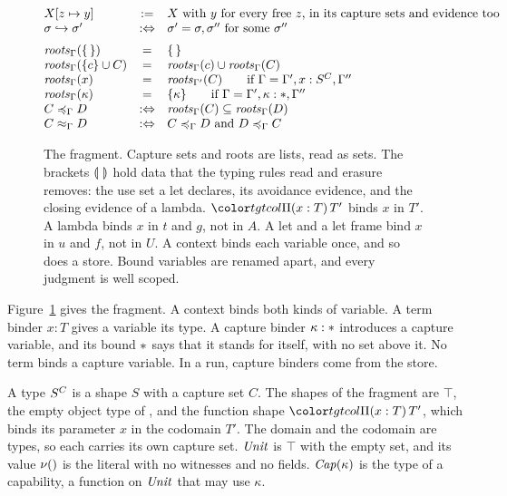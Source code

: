 \begin{figure}[t]
\[\begin{array}{@{}lcl@{}}
X[z \mapsto y] & \mathrel{:=} & X \text{ with } y \text{ for every free } z \text{, in its capture sets and evidence too} \\
\sext{\sigma}{\sigma'} & \mathrel{:\Leftrightarrow} & \sigma' = \sigma, \sigma'' \text{ for some } \sigma'' \\[6pt]
\roots{\Gamma}{\cempty} & = & \cempty \\
\roots{\Gamma}{\cset{c} \cup C} & = & \roots{\Gamma}{c} \cup \roots{\Gamma}{C} \\
\roots{\Gamma}{x} & = & \roots{\Gamma'}{C} \qquad \text{if } \Gamma = \Gamma', x : \capt{S}{C}, \Gamma'' \\
\roots{\Gamma}{\kappa} & = & \cset{\kappa} \qquad \text{if } \Gamma = \Gamma', \kappa : \cstar, \Gamma'' \\
\caple{\Gamma}{C}{D} & \mathrel{:\Leftrightarrow} & \roots{\Gamma}{C} \subseteq \roots{\Gamma}{D} \\
\capeqv{\Gamma}{C}{D} & \mathrel{:\Leftrightarrow} & \caple{\Gamma}{C}{D} \text{ and } \caple{\Gamma}{D}{C}
\end{array}
\]
\color{black}
\caption{The fragment. Capture sets and roots are lists, read as sets. The brackets $\mathopen{\llparenthesis}\ \mathclose{\rrparenthesis}$ hold data that the typing rules read and erasure removes: the use set a let declares, its avoidance evidence, and the closing evidence of a lambda. $\pit[x]{T}{T'}$ binds $x$ in $T'$. A lambda binds $x$ in $t$ and $g$, not in $A$. A let and a let frame bind $x$ in $u$ and $f$, not in $U$. A context binds each variable once, and so does a store. Bound variables are renamed apart, and every judgment is well scoped.}
\label{fig:mini-syntax}
\end{figure}

Figure~\ref{fig:mini-syntax} gives the fragment. A context binds both kinds of variable. A term binder $x : T$ gives a variable its type. A capture binder $\kappa : \ast$ introduces a capture variable, and its bound $\ast$ says that it stands for itself, with no set above it. No term binds a capture variable. In a run, capture binders come from the store.

A type $S^{C}$ is a shape $S$ with a capture set $C$. The shapes of the fragment are $\top$, the empty object type of \Rone, and the function shape $\pit[x]{T}{T'}$, which binds its parameter $x$ in the codomain $T'$. The domain and the codomain are types, so each carries its own capture set. $\mathit{Unit}$ is $\top$ with the empty set, and its value $\nu()$ is the literal with no witnesses and no fields. $\mathit{Cap}(\kappa)$ is the type of a capability, a function on $\mathit{Unit}$ that may use $\kappa$.


